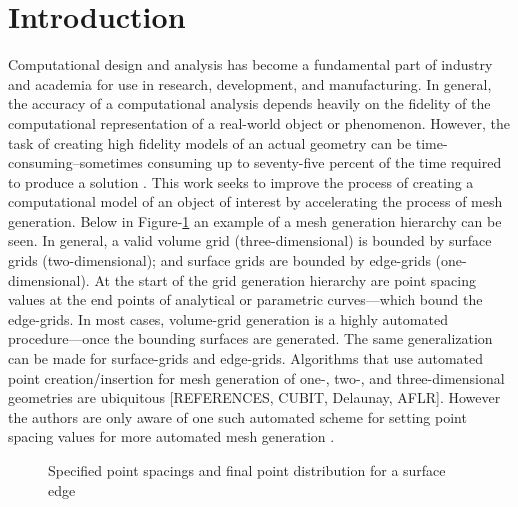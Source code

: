 \section{Introduction}Computational design and analysis has become a fundamental part of industry and academia for use in research, development, and manufacturing. In general, the accuracy of a computational analysis depends heavily on the fidelity of the computational representation of a real-world object or phenomenon. However, the task of creating high fidelity models of an actual geometry can be time-consuming--sometimes consuming up to seventy-five percent of the time required to produce a solution \cite{bischoff05}. This work seeks to improve the process of creating a computational model of an object of interest by accelerating the process of mesh generation. Below in Figure-\ref{GridGenerationProcess} an example of a mesh generation hierarchy can be seen. In general, a valid volume grid (three-dimensional) is bounded by surface grids (two-dimensional); and surface grids are bounded by edge-grids (one-dimensional). At the start of the grid generation hierarchy are point spacing values at the end points of analytical or parametric curves—which bound the edge-grids. In most cases, volume-grid generation is a highly automated procedure—once the bounding surfaces are generated. The same generalization can be made for surface-grids and edge-grids. Algorithms that use automated point creation/insertion for mesh generation of one-, two-, and three-dimensional geometries are ubiquitous [REFERENCES, CUBIT, Delaunay, AFLR]. However the authors are only aware of one such automated scheme for setting point spacing values for more automated mesh generation \cite{mclaurin12}.\\

\begin{figure}[h!]
 \caption{\label{GridGenerationProcess} Specified point spacings and final point distribution for a surface edge \cite{thompson98}}
\end{figure}

